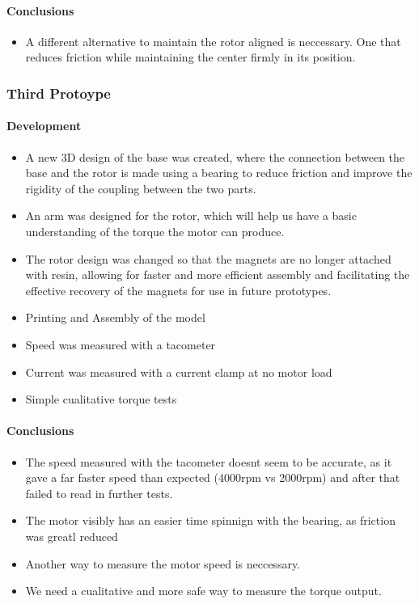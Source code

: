 \documentclass{article}
\begin{document}
\paragraph{Conclusions}
\begin{itemize}
    \item A different alternative to maintain the rotor aligned is neccessary. One that reduces friction while maintaining the center firmly in its position.
\end{itemize}

\subsubsection{Third Protoype}


\paragraph[short]{Development}
\begin{itemize}
    \item A new 3D design of the base was created, where the connection between the base and the rotor is made using a bearing to reduce friction and improve the rigidity of the coupling between the two parts.
    \item An arm was designed for the rotor, which will help us have a basic understanding of the torque the motor can produce.
    \item The rotor design was changed so that the magnets are no longer attached with resin, allowing for faster and more efficient assembly and facilitating the effective recovery of the magnets for use in future prototypes.
    \item Printing and Assembly of the model
    \item Speed was measured with a tacometer
    \item Current was measured with a current clamp at no motor load
    \item Simple cualitative torque tests
\end{itemize}

\paragraph[short]{Conclusions}
\begin{itemize}
    \item The speed measured with the tacometer doesnt seem to be accurate, as it gave a far faster speed than expected (4000rpm vs 2000rpm) and after that failed to read in further tests.
    \item The motor visibly has an easier time spinnign with the bearing, as friction was greatl reduced
    \item Another way to measure the motor speed is neccessary.
    \item We need a cualitative and more safe way to measure the torque output.
\end{itemize}
\end{document}
